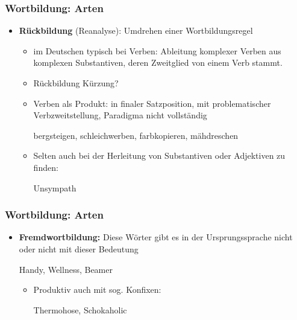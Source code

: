\begin{frame}
\frametitle{Wortbildung: Arten}

\begin{itemize}
	\item \textbf{Rückbildung} (Reanalyse): Umdrehen einer Wortbildungsregel
	
	\begin{itemize}
		\item im Deutschen typisch bei Verben: Ableitung komplexer Verben aus komplexen Substantiven, deren Zweitglied von einem Verb stammt.
		\item Rückbildung \ras Kürzung?
		\item Verben als Produkt: in finaler Satzposition, mit problematischer Verbzweitstellung, Paradigma nicht vollständig
		
		\ea bergsteigen, schleichwerben, farbkopieren, mähdreschen
		\z
		
		\item Selten auch bei der Herleitung von Substantiven oder Adjektiven zu finden:
		
		\ea Unsympath
		\z
		
	\end{itemize}
\end{itemize}


\end{frame}


\begin{frame}
\frametitle{Wortbildung: Arten}

\begin{itemize}
	\item \textbf{Fremdwortbildung:} Diese Wörter gibt es in der Ursprungssprache nicht oder nicht mit dieser Bedeutung
	
	\ea Handy, Wellness, Beamer
	\z
	
	\begin{itemize}
		\item Produktiv auch mit sog. Konfixen:
		
		\ea Thermohose, Schokaholic
		\z
		
	\end{itemize}
	
\end{itemize}


\end{frame}


